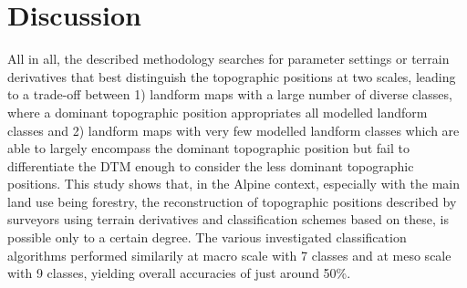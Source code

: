 \documentclass[preprint,12pt,authoryear]{elsarticle}
\begin{document}
\section{Discussion}
All in all, the described methodology searches for parameter settings or terrain derivatives that best distinguish the topographic positions at two scales, leading to a trade-off between 1) landform maps with a large number of diverse classes, where a dominant topographic position appropriates all modelled landform classes and 2) landform maps with very few modelled landform classes which are able to largely encompass the dominant topographic position but fail to differentiate the DTM enough to consider the less dominant topographic positions.
This study shows that, in the Alpine context, especially with the main land use being forestry, the reconstruction of topographic positions described by surveyors using terrain derivatives and classification schemes based on these, is possible only to a certain degree. The various investigated classification algorithms performed similarily at macro scale with 7 classes and at meso scale with 9 classes, yielding overall accuracies of just around 50\%.
\end{document}

